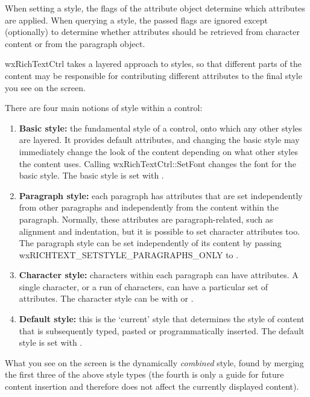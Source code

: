 When setting a style, the flags of the attribute object determine which
attributes are applied. When querying a style, the passed flags are ignored
except (optionally) to determine whether attributes should be retrieved from
character content or from the paragraph object.

wxRichTextCtrl takes a layered approach to styles, so that different parts of
the content may be responsible for contributing different attributes to the final
style you see on the screen.

There are four main notions of style within a control:

\begin{enumerate}\itemsep=0pt
\item {\bf Basic style:} the fundamental style of a control, onto which any other
styles are layered. It provides default attributes, and changing the basic style
may immediately change the look of the content depending on what other styles
the content uses. Calling wxRichTextCtrl::SetFont changes the font for the basic style.
The basic style is set with .
\item {\bf Paragraph style:} each paragraph has attributes that are set independently
from other paragraphs and independently from the content within the paragraph.
Normally, these attributes are paragraph-related, such as alignment and indentation,
but it is possible to set character attributes too.
The paragraph style can be set independently of its content by passing wxRICHTEXT\_SETSTYLE\_PARAGRAPHS\_ONLY
to .
\item {\bf Character style:} characters within each paragraph can have attributes.
A single character, or a run of characters, can have a particular set of attributes.
The character style can be with  or 
.
\item {\bf Default style:} this is the `current' style that determines the
style of content that is subsequently typed, pasted or programmatically inserted.
The default style is set with .
\end{enumerate}

What you see on the screen is the dynamically {\it combined} style, found by merging
the first three of the above style types (the fourth is only a guide for future content
insertion and therefore does not affect the currently displayed content).

